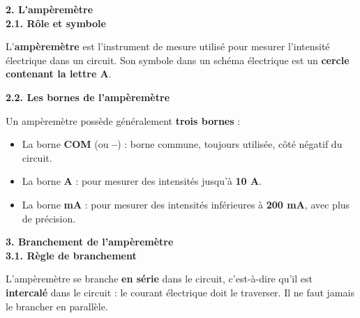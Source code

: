 \documentclass[11pt,a4paper]{article}
\begin{document}
\vspace{3mm}

\textbf{2. L'ampèremètre} \\

\textbf{2.1. Rôle et symbole}

\begin{tcolorbox}[colback=red!5!white,colframe=red!75!black]
{
L'\textbf{ampèremètre} est l'instrument de mesure utilisé pour mesurer l'intensité électrique dans un circuit. Son symbole dans un schéma électrique est un \textbf{cercle contenant la lettre A}.

\begin{center}
\end{center}
}
\end{tcolorbox}

\textbf{2.2. Les bornes de l'ampèremètre}

Un ampèremètre possède généralement \textbf{trois bornes} :

\begin{itemize}
    \item La borne \textbf{COM} (ou \textbf{--}) : borne commune, toujours utilisée, côté négatif du circuit.
    \item La borne \textbf{A} : pour mesurer des intensités jusqu'à \textbf{10 A}.
    \item La borne \textbf{mA} : pour mesurer des intensités inférieures à \textbf{200 mA}, avec plus de précision.
\end{itemize}


\vspace{3mm}

\textbf{3. Branchement de l'ampèremètre} \\

\textbf{3.1. Règle de branchement}

\begin{tcolorbox}[colback=red!5!white,colframe=red!75!black]
{
L'ampèremètre se branche \textbf{en série} dans le circuit, c'est-à-dire qu'il est \textbf{intercalé} dans le circuit : le courant électrique doit le traverser. Il ne faut jamais le brancher en parallèle.
}
\end{tcolorbox}
\end{document}
